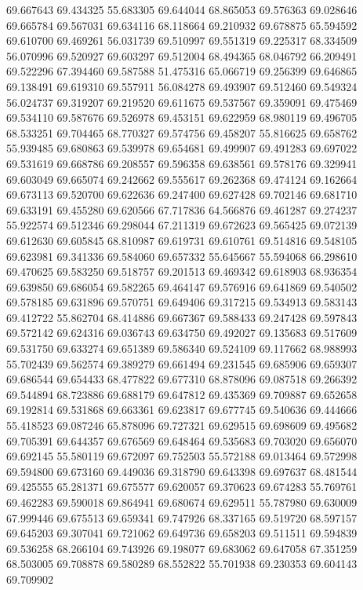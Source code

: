 69.667643
69.434325
55.683305
69.644044
68.865053
69.576363
69.028646
69.665784
69.567031
69.634116
68.118664
69.210932
69.678875
65.594592
69.610700
69.469261
56.031739
69.510997
69.551319
69.225317
68.334509
56.070996
69.520927
69.603297
69.512004
68.494365
68.046792
66.209491
69.522296
67.394460
69.587588
51.475316
65.066719
69.256399
69.646865
69.138491
69.619310
69.557911
56.084278
69.493907
69.512460
69.549324
56.024737
69.319207
69.219520
69.611675
69.537567
69.359091
69.475469
69.534110
69.587676
69.526978
69.453151
69.622959
68.980119
69.496705
68.533251
69.704465
68.770327
69.574756
69.458207
55.816625
69.658762
55.939485
69.680863
69.539978
69.654681
69.499907
69.491283
69.697022
69.531619
69.668786
69.208557
69.596358
69.638561
69.578176
69.329941
69.603049
69.665074
69.242662
69.555617
69.262368
69.474124
69.162664
69.673113
69.520700
69.622636
69.247400
69.627428
69.702146
69.681710
69.633191
69.455280
69.620566
67.717836
64.566876
69.461287
69.274237
55.922574
69.512346
69.298044
67.211319
69.672623
69.565425
69.072139
69.612630
69.605845
68.810987
69.619731
69.610761
69.514816
69.548105
69.623981
69.341336
69.584060
69.657332
55.645667
55.594068
66.298610
69.470625
69.583250
69.518757
69.201513
69.469342
69.618903
68.936354
69.639850
69.686054
69.582265
69.464147
69.576916
69.641869
69.540502
69.578185
69.631896
69.570751
69.649406
69.317215
69.534913
69.583143
69.412722
55.862704
68.414886
69.667367
69.588433
69.247428
69.597843
69.572142
69.624316
69.036743
69.634750
69.492027
69.135683
69.517609
69.531750
69.633274
69.651389
69.586340
69.524109
69.117662
68.988993
55.702439
69.562574
69.389279
69.661494
69.231545
69.685906
69.659307
69.686544
69.654433
68.477822
69.677310
68.878096
69.087518
69.266392
69.544894
68.723886
69.688179
69.647812
69.435369
69.709887
69.652658
69.192814
69.531868
69.663361
69.623817
69.677745
69.540636
69.444666
55.418523
69.087246
65.878096
69.727321
69.629515
69.698609
69.495682
69.705391
69.644357
69.676569
69.648464
69.535683
69.703020
69.656070
69.692145
55.580119
69.672097
69.752503
55.572188
69.013464
69.572998
69.594800
69.673160
69.449036
69.318790
69.643398
69.697637
68.481544
69.425555
65.281371
69.675577
69.620057
69.370623
69.674283
55.769761
69.462283
69.590018
69.864941
69.680674
69.629511
55.787980
69.630009
67.999446
69.675513
69.659341
69.747926
68.337165
69.519720
68.597157
69.645203
69.307041
69.721062
69.649736
69.658203
69.511511
69.594839
69.536258
68.266104
69.743926
69.198077
69.683062
69.647058
67.351259
68.503005
69.708878
69.580289
68.552822
55.701938
69.230353
69.604143
69.709902
